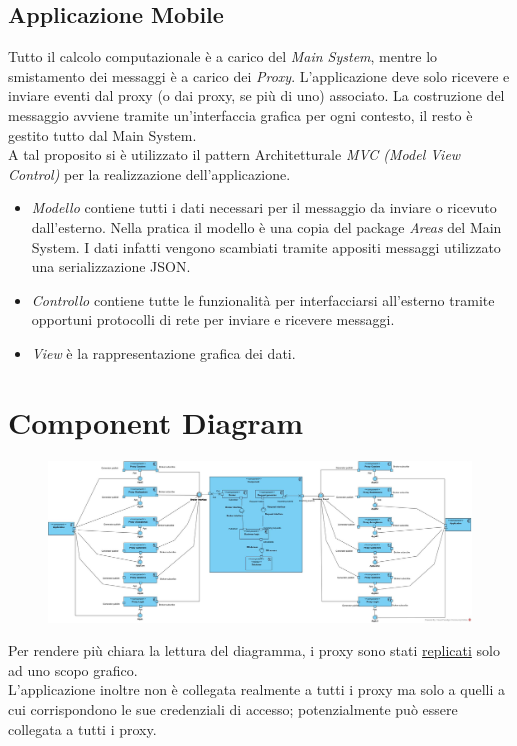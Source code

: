 \subsection{Applicazione Mobile}
Tutto il calcolo computazionale è a carico del \textit{Main System}, mentre lo smistamento dei messaggi è a carico dei \textit{Proxy}. L'applicazione deve solo ricevere e inviare eventi dal proxy (o dai proxy, se più di uno) associato. La costruzione del messaggio avviene tramite un'interfaccia grafica per ogni contesto, il resto è gestito tutto dal Main System.
\\A tal proposito si è utilizzato il pattern Architetturale \textit{MVC (Model View Control)} per la realizzazione dell'applicazione.
\begin{itemize}
	\item \textit{Modello} contiene tutti i dati necessari per il messaggio da inviare o ricevuto dall'esterno. Nella pratica il modello è una copia del package \textit{Areas} del Main System. I dati infatti vengono scambiati tramite appositi messaggi utilizzato una serializzazione JSON.
	\item \textit{Controllo} contiene tutte le funzionalità per interfacciarsi all'esterno tramite opportuni protocolli di rete per inviare e ricevere messaggi.
	\item \textit{View} è la rappresentazione grafica dei dati.
\end{itemize}

\section{Component Diagram}
\begin{figure}[H]
	\centering
	\includegraphics[width=1\textwidth]{Immagini/components.jpg}
\end{figure}
Per rendere più chiara la lettura del diagramma, i proxy sono stati \underline{replicati} solo ad uno scopo grafico. 
\\L'applicazione inoltre non è collegata realmente a tutti i proxy ma solo a quelli a cui corrispondono le sue credenziali di accesso; potenzialmente può essere collegata a tutti i proxy.

